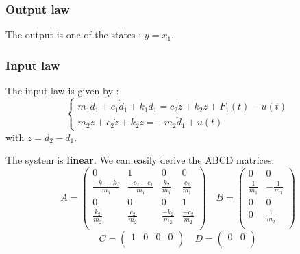\subsubsection{Output law}
The output is one of the states : $y = x_1$.

\subsubsection{Input law}
The input law is given by \cite{sciencedirect_amd_2} :
$$
\begin{cases}
    m_{1}\ddot{d}_{1} + c_{1}\dot{d}_{1} + k_{1}d_{1} = c_{2}\dot{z} + k_{2}z + F_{1}(t) - u(t)\\
    m_{2}\ddot{z} + c_{2}\dot{z} + k_{2}z = -m_{2}\ddot{d}_{1} + u(t)
\end{cases}
$$
with $z = d_2 - d_1$.\par
The system is \textbf{linear}. We can easily derive the ABCD matrices.
$$
A = \begin{pmatrix}
    0 & 1 & 0 & 0 \\
    \frac{-k_1-k_2}{m_1} & \frac{-c_2-c_1}{m_1} & \frac{k_2}{m_1} & \frac{c_2}{m_1} \\
    0 & 0 & 0 & 1 \\ 
    \frac{k_2}{m_2} & \frac{c_2}{m_2} & \frac{-k_2}{m_2} & \frac{-c_2}{m_2}\\
\end{pmatrix}
\quad
B = \begin{pmatrix}
    0 & 0\\
    \frac{1}{m_1} & -\frac{1}{m_1}\\
    0 & 0\\
    0 & \frac{1}{m_2}\\
\end{pmatrix}
$$
$$
C = \begin{pmatrix}
    1 & 0 & 0 & 0\\
\end{pmatrix}
\quad
D = \begin{pmatrix}
    0 & 0\\
\end{pmatrix}
$$
